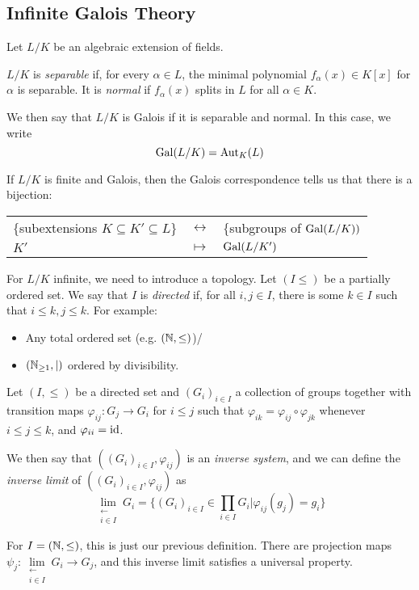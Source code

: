 \documentclass[10pt,a4paper]{article}
\begin{document}
\subsection{Infinite Galois Theory}
Let $L/K$ be an algebraic extension of fields.
\begin{definition}
  $L/K$ is \emph{separable} if, for every $\alpha \in L$, the minimal polynomial $f_\alpha(x) \in K[x]$ for $\alpha$ is separable. It is \emph{normal} if $f_\alpha(x)$ splits in $L$ for all $\alpha \in K$.

  We then say that $L/K$ is Galois if it is separable and normal. In this case, we write
  \[\operatorname{Gal}(L/K) = \operatorname{Aut}_K(L)\]
\end{definition}
If $L/K$ is finite and Galois, then the Galois correspondence tells us that there is a bijection:
\begin{center}
\begin{tabular}{p{}p{}p{}}
  \raggedleft $\{$subextensions $K \subseteq K'\subseteq L\}$ & $\longleftrightarrow$ & $\{$subgroups of $\operatorname{Gal}(L/K))$\\
  \raggedleft $K'$ & $\longmapsto$ & $\operatorname{Gal}(L/K')$
\end{tabular}
\end{center}
For $L/K$ infinite, we need to introduce a topology. Let $(I \leq)$ be a partially ordered set. We say that $I$ is \emph{directed} if, for all $i, j \in I$, there is some $k \in I$ such that $i \leq k, j\leq k$. For example:
\begin{itemize}
  \item Any total ordered set (e.g. $(\mathbb{N}, \leq)$)/
  \item $(\mathbb{N}_{\geq 1}, |)$ ordered by divisibility.
\end{itemize}
\begin{definition}
  Let $(I, \leq)$ be a directed set and $(G_i)_{i\in I}$ a collection of groups together with transition maps $\varphi_{ij}:G_j \to G_i$ for $i \leq j$ such that $\varphi_{ik} = \varphi_{ij}\circ \varphi_{jk}$ whenever $i \leq j \leq k$, and $\varphi_{ii} = \operatorname{id}$.

  We then say that $((G_i)_{i \in I}, \varphi_{ij})$ is an \emph{inverse system}, and we can define the \emph{inverse limit} of $((G_{i})_{i \in I}, \varphi_{ij})$ as
  \[\lim_{\substack{\leftarrow\\i \in I}} G_i = \{(G_i)_{i \in I} \in \prod_{i\in I}G_i | \varphi_{ij}(g_j) = g_i\}\]
\end{definition}
For $I = (\mathbb{N}, \leq)$, this is just our previous definition. There are projection maps $\psi_j : \lim\limits_{\substack{\leftarrow\\i\in I}} G_i \to G_j$, and this inverse limit satisfies a universal property.
\end{document}
